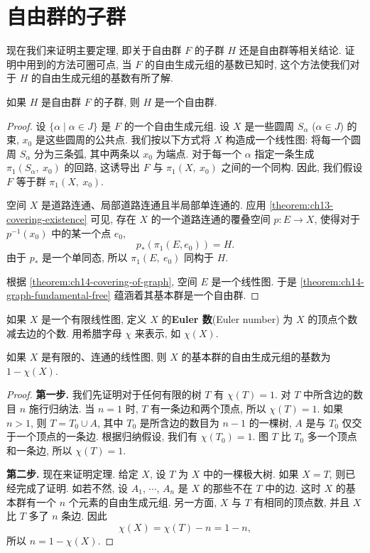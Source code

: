 ﻿\section{自由群的子群}
\label{ch14-sec85}

现在我们来证明主要定理, 即关于自由群 $F$ 的子群 $H$ 还是自由群等相关结论. 证明中用到的方法可圈可点, 当 $F$ 的自由生成元组的基数已知时, 这个方法使我们对于 $H$ 的自由生成元组的基数有所了解.

\begin{theorem}[自由群的子群是自由群]
\label{theorem:ch14-subgroup-free}
如果 $H$ 是自由群 $F$ 的子群, 则 $H$ 是一个自由群.
\end{theorem}

\begin{proof}
设 $\{\alpha\mid\alpha\in J\}$ 是 $F$ 的一个自由生成元组. 设 $X$ 是一些圆周 $S_{\alpha}$ ($\alpha\in J$) 的束, $x_{0}$ 是这些圆周的公共点. 我们按以下方式将 $X$ 构造成一个线性图: 将每一个圆周 $S_{\alpha}$ 分为三条弧, 其中两条以 $x_{0}$ 为端点. 对于每一个 $\alpha$ 指定一条生成 $\pi_{1}(S_{\alpha},\ x_{0})$ 的回路, 这诱导出 $F$ 与 $\pi_{1}(X,\ x_{0})$ 之间的一个同构. 因此, 我们假设 $F$ 等于群 $\pi_{1}(X,\ x_{0})$.

空间 $X$ 是道路连通、局部道路连通且半局部单连通的. 应用 \cref{theorem:ch13-covering-existence} 可见, 存在 $X$ 的一个道路连通的覆叠空间 $p\colon E\to X$, 使得对于 $p^{-1}(x_{0})$ 中的某一个点 $e_{0}$,
\[
p_{*}(\pi_{1}(E,e_{0}))=H.
\]
由于 $p_{*}$ 是一个单同态, 所以 $\pi_{1}(E,\ e_{0})$ 同构于 $H$.

根据 \cref{theorem:ch14-covering-of-graph}, 空间 $E$ 是一个线性图. 于是 \cref{theorem:ch14-graph-fundamental-free} 蕴涵着其基本群是一个自由群.
\end{proof}

\begin{definition}[Euler 数]
\label{definition:ch14-euler-number}
如果 $X$ 是一个有限线性图, 定义 $X$ 的\textbf{Euler 数}(Euler number) 为 $X$ 的顶点个数减去边的个数. 用希腊字母 $\chi$ 来表示, 如 $\chi(X)$.
\end{definition}

\begin{lemma}[有限连通图的秩公式]
\label{lemma:ch14-rank-formula}
如果 $X$ 是有限的、连通的线性图, 则 $X$ 的基本群的自由生成元组的基数为 $1-\chi(X)$.
\end{lemma}

\begin{proof}
\textbf{第一步.} 我们先证明对于任何有限的树 $T$ 有 $\chi(T)=1$. 对 $T$ 中所含边的数目 $n$ 施行归纳法. 当 $n=1$ 时, $T$ 有一条边和两个顶点, 所以 $\chi(T)=1$. 如果 $n>1$, 则 $T=T_{0}\cup A$, 其中 $T_{0}$ 是所含边的数目为 $n-1$ 的一棵树, $A$ 是与 $T_{0}$ 仅交于一个顶点的一条边. 根据归纳假设, 我们有 $\chi(T_{0})=1$. 图 $T$ 比 $T_{0}$ 多一个顶点和一条边, 所以 $\chi(T)=1$.

\textbf{第二步.} 现在来证明定理. 给定 $X$, 设 $T$ 为 $X$ 中的一棵极大树. 如果 $X=T$, 则已经完成了证明. 如若不然, 设 $A_{1}$, $\cdots$, $A_{n}$ 是 $X$ 的那些不在 $T$ 中的边. 这时 $X$ 的基本群有一个 $n$ 个元素的自由生成元组. 另一方面, $X$ 与 $T$ 有相同的顶点数, 并且 $X$ 比 $T$ 多了 $n$ 条边. 因此
\[
\chi(X)=\chi(T)-n=1-n,
\]
所以 $n=1-\chi(X)$.
\end{proof}

